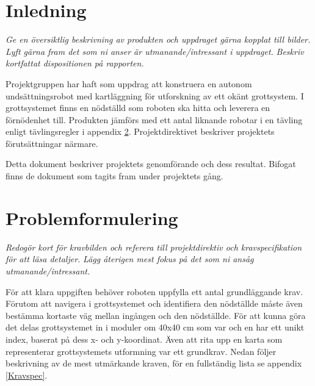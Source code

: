 \documentclass[11pt]{article}
\begin{document}
\begin{flushleft}
\section{Inledning}
\textit{Ge en översiktlig beskrivning av produkten och uppdraget gärna kopplat till bilder.}
\textit{Lyft gärna fram det som ni anser är utmanande/intressant i uppdraget.}
\textit{Beskriv kortfattat dispositionen på rapporten.}

Projektgruppen har haft som uppdrag att konstruera en autonom undsättningsrobot med kartläggning för utforskning av ett okänt grottsystem. I grottsystemet finns en nödställd som roboten ska hitta och leverera en förnödenhet till. Produkten jämförs med ett antal liknande robotar i en tävling enligt tävlingsregler i appendix \ref{}. Projektdirektivet beskriver projektets förutsättningar närmare. 

Detta dokument beskriver projektets genomförande och dess resultat. Bifogat finns de dokument som tagits fram under projektets gång.

\pagebreak

\section{Problemformulering}
\textit{Redogör kort för kravbilden och referera till projektdirektiv och kravspecifikation för att läsa detaljer.}
\textit{Lägg återigen mest fokus på det som ni ansåg utmanande/intressant.}

För att klara uppgiften behöver roboten uppfylla ett antal grundläggande krav. Förutom att navigera i grottsystemet och identifiera den nödställde måste även bestämma kortaste väg mellan ingången och den nödställde. För att kunna göra det delas grottsystemet in i moduler om 40x40 cm som var och en har ett unikt index, baserat på dess x- och y-koordinat. Även att rita upp en karta som representerar grottsystemets utformning var ett grundkrav. Nedan följer beskrivning av de mest utmärkande kraven, för en fullständig lista se appendix \ref{Kravspec}.



\end{flushleft}
\end{document}
